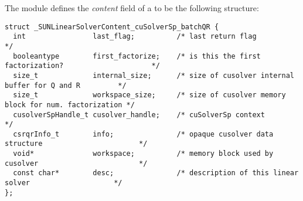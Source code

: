 The  module defines the
{\em content} field of a  to be the following structure:
\begin{verbatim}
struct _SUNLinearSolverContent_cuSolverSp_batchQR {
  int                last_flag;          /* last return flag                                     */
  booleantype        first_factorize;    /* is this the first factorization?                     */
  size_t             internal_size;      /* size of cusolver internal buffer for Q and R         */
  size_t             workspace_size;     /* size of cusolver memory block for num. factorization */
  cusolverSpHandle_t cusolver_handle;    /* cuSolverSp context                                   */
  csrqrInfo_t        info;               /* opaque cusolver data structure                       */
  void*              workspace;          /* memory block used by cusolver                        */
  const char*        desc;               /* description of this linear solver                    */
};
\end{verbatim}
